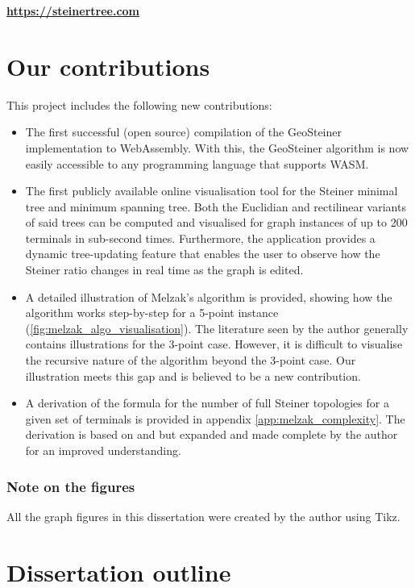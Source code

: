 \documentclass{l4proj}
\begin{document}
\begin{tcolorbox}[title=Access the end product here, colback=gray!10, colframe=gray!80]
    \centering
    \Huge{\textbf{\url{https://steinertree.com}}}
\end{tcolorbox}

\section{Our contributions}
This project includes the following new contributions:
\begin{itemize}
    \item The first successful (open source) compilation of the GeoSteiner implementation to WebAssembly. With this, the GeoSteiner algorithm is now easily accessible to any programming language that supports WASM.
    \item The first publicly available online visualisation tool for the Steiner minimal tree and minimum spanning tree. Both the Euclidian and rectilinear variants of said trees can be computed and visualised for graph instances of up to 200 terminals in sub-second times. Furthermore, the application provides a dynamic tree-updating feature that enables the user to observe how the Steiner ratio changes in real time as the graph is edited.
    \item A detailed illustration of Melzak's algorithm is provided, showing how the algorithm works step-by-step for a 5-point instance (\ref{fig:melzak_algo_visualisation}). The literature seen by the author generally contains illustrations for the 3-point case. However, it is difficult to visualise the recursive nature of the algorithm beyond the 3-point case. Our illustration meets this gap and is believed to be a new contribution.
    \item A derivation of the formula for the number of full Steiner topologies for a given set of terminals is provided in appendix \ref{app:melzak_complexity}. The derivation is based on \citet{geosteiner96} and \citet{Gilbert1968SteinerMT} but expanded and made complete by the author for an improved understanding.
\end{itemize}

\subsubsection{Note on the figures} All the graph figures in this dissertation were created by the author using Tikz.

\section{Dissertation outline}
\end{document}
